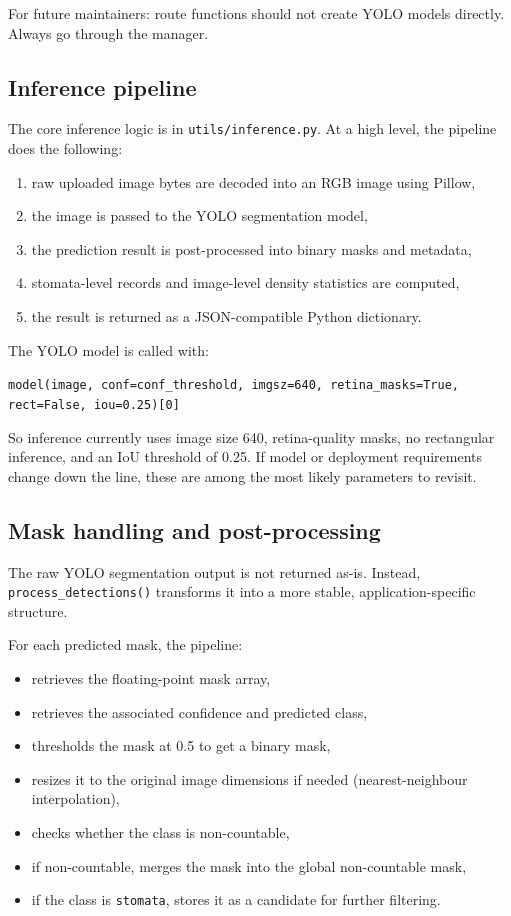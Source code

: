 \documentclass{article}
\begin{document}
For future maintainers: route functions should not create YOLO models directly. Always go through the manager.

\subsection{Inference pipeline}

The core inference logic is in \texttt{utils/inference.py}. At a high level, the pipeline does the following:

\begin{enumerate}
    \item raw uploaded image bytes are decoded into an RGB image using Pillow,
    \item the image is passed to the YOLO segmentation model,
    \item the prediction result is post-processed into binary masks and metadata,
    \item stomata-level records and image-level density statistics are computed,
    \item the result is returned as a JSON-compatible Python dictionary.
\end{enumerate}

The YOLO model is called with:
\begin{center}
\texttt{model(image, conf=conf\_threshold, imgsz=640, retina\_masks=True, rect=False, iou=0.25)[0]}
\end{center}

So inference currently uses image size 640, retina-quality masks, no rectangular inference, and an IoU threshold of 0.25. If model or deployment requirements change down the line, these are among the most likely parameters to revisit.

\subsection{Mask handling and post-processing}

The raw YOLO segmentation output is not returned as-is. Instead, \texttt{process\_detections()} transforms it into a more stable, application-specific structure.

For each predicted mask, the pipeline:

\begin{itemize}
    \item retrieves the floating-point mask array,
    \item retrieves the associated confidence and predicted class,
    \item thresholds the mask at 0.5 to get a binary mask,
    \item resizes it to the original image dimensions if needed (nearest-neighbour interpolation),
    \item checks whether the class is non-countable,
    \item if non-countable, merges the mask into the global non-countable mask,
    \item if the class is \texttt{stomata}, stores it as a candidate for further filtering.
\end{itemize}
\end{document}
